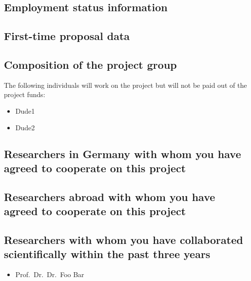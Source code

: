 \documentclass{scrartcl}
\begin{document}
\subsection{Employment status information}

\subsection{First-time proposal data}

\subsection{Composition of the project group}

The following individuals will work on the project but will not be paid out of the project funds:

\begin{itemize}
\item Dude1
\item Dude2
\end{itemize}

\subsection{Researchers in Germany with whom you have agreed to cooperate on this project}

\subsection{Researchers abroad with whom you have agreed to cooperate on this project}

\subsection{Researchers with whom you have collaborated scientifically within the past three years}
\begin{itemize}
  \item Prof.\ Dr.\ Dr.\ Foo Bar
\end{itemize}
\end{document}
